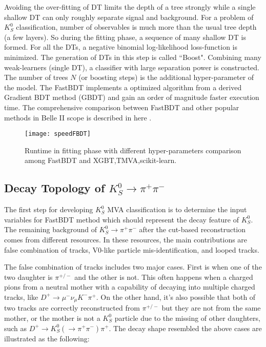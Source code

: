 Avoiding the over-fitting of DT limits the depth of a tree strongly while a single shallow DT can only roughly separate signal and background. For a problem of $K_S^0$ classification, number of observables is much more than the usual tree depth (a few layers). So during the fitting phase, a sequence of many shallow DT is formed. For all the DTs, a negative binomial log-likelihood loss-function is minimized. The generation of DTs in this step is called ``Boost". Combining many weak-learners (single DT), a classifier with large separation power is constructed. The number of trees $N$ (or boosting steps) is the additional hyper-parameter of the model. 
The FastBDT implements a optimized algorithm from a derived Gradient BDT method (GBDT)\cite{friedman2001greedy} and gain an order of magnitude faster execution time. The comprehensive comparison between FastBDT and other popular methods in Belle II scope is described in here \cite{keck2016fastbdt}. 

\begin{figure}[htpb]
	\centering
	\texttt{[image: speedFBDT]}
	\caption{Runtime in fitting phase with different hyper-parameters comparison among FastBDT and XGBT,TMVA,scikit-learn.\cite{keck2016fastbdt}}
\end{figure}

\subsection{Decay Topology of $K_S^0 \to \pi^+ \pi^-$}
The first step for developing $K_S^0$ MVA classification is to determine the input variables for FastBDT method which should represent the decay feature of $K_S^0$.
The remaining background of  $K_S^0 \to \pi^+ \pi^-$ after the cut-based reconstruction comes from different resources. In these resources, the main contributions are false combination of tracks, V0-like particle mis-identification, and looped tracks. 

The false combination of tracks includes two major cases. First is when one of the two daughter is $\pi^{+/-}$ and the other is not. This often happens when a charged pions from a neutral mother with a capability of decaying into multiple charged tracks, like $D^+ \to \mu^- \nu_{\mu} K^- \pi^+$. On the other hand, it's also possible that both of two tracks are correctly reconstructed from $\pi^{+/-}$ but they are not from the same mother, or the mother is not a $K_S^0$ particle due to the missing of other daughters, such as $D^+ \to K_S^0 (  \to \pi^+ \pi^-) \pi^+$. The decay shape resembled the above cases are illustrated as the following:  


